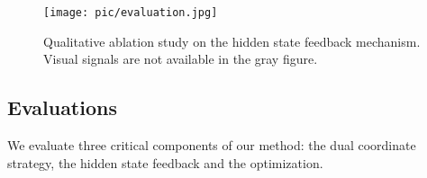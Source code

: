 \documentclass[sigconf,nonacm=true]{acmart}
\begin{document}
\begin{table}[t]
\caption{Quantitative ablation study on the dual coordinate strategy, hidden state feedback mechanism, and optimization. We performed it on TotalCapture and 3DPW-OCC datasets as these two datasets contain cases where humans are occluded or out of the camera view, which are challenging and best demonstrate our key algorithms.}
\label{tab:ablitioncmp}
\end{table}
\begin{figure}
  \texttt{[image: pic/evaluation.jpg]}
  \centering
  \caption{
  Qualitative ablation study on the hidden state feedback mechanism. Visual signals are not available in the gray figure.}
  \label{fig:evaluation}
\end{figure}
\subsection{Evaluations}\label{sec:evaluations}
We evaluate three critical components of our method: the dual coordinate strategy, the hidden state feedback and the optimization.
\end{document}
